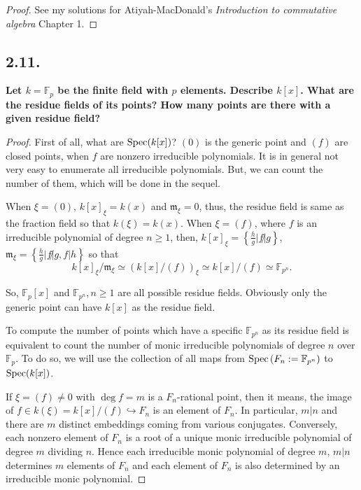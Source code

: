 \documentclass[11pt]{amsart}          %
\newcommand{\spec}{{\rm Spec}}
\begin{document}
\begin{proof}See my solutions for Atiyah-MacDonald's {\it Introduction to commutative algebra} Chapter 1.\end{proof}

\subsection*{2.11.} \textbf{Let $k = \mathbb{F}_p$ be the finite field with $p$ elements. Describe $k[x]$. What are the residue fields of its points? How many points are there with a given residue field?}

\begin{proof}First of all, what are $\spec (k[x])$? $(0)$ is the generic point and $(f)$ are closed points, when $f$ are nonzero irreducible polynomials. It is in general not very easy to enumerate all irreducible polynomials. But, we can count the number of them, which will be done in the sequel.

When $\xi = (0)$, $k[x]_{\xi} = k(x)$ and $\mathfrak{m}_\xi = 0$, thus, the residue field is same as the fraction field so that $k(\xi) = k(x)$. When $\xi= (f)$, where $f$ is an irreducible polynomial of degree $n \geq 1$, then, $k[x]_\xi = \left\{ \frac{h}{g} | f \not | g \right\}$, $\mathfrak{m} _{\xi} = \left\{ \frac{h}{g} | f \not | g , f | h \right\}$ so that
$$k[x] _{\xi} / \mathfrak{m} _{\xi} \simeq \left( k[x] / (f) \right) _{\xi} \simeq k[x] / (f) \simeq \mathbb{F} _{p^n}.$$

So, $\mathbb{F}_p [x]$ and $\mathbb{F}_{p^n}, n \geq 1$ are all possible residue fields. Obviously only the generic point can have $k[x]$ as the residue field. 

To compute the number of points which have a specific $\mathbb{F}_{p^n}$ as its residue field is equivalent to count the number of monic irreducible polynomials of degree $n$ over $\mathbb{F}_p$. To do so, we will use the collection of all maps from $\spec \left(F_n:=\mathbb{F}_{p^n}\right)$ to $\spec (k[x])$.

If $\xi= (f)\not = 0$ with $\deg f = m$ is a $F_n$-rational point, then it means, the image of $f\in k(\xi) = k[x]/(f) \hookrightarrow F_n$ is an element of $F_n$.  In particular, $m | n$ and there are $m$ distinct embeddings coming from various conjugates. Conversely, each nonzero element of $F_n$ is a root of a unique monic irreducible polynomial of degree $m$ dividing $n$. Hence each irreducible monic polynomial of degree $m$, $m | n$ determines $m$ elements of $F_n$ and each element of $F_n$ is also determined by an irreducible monic polynomial.


\end{proof}
\end{document}
